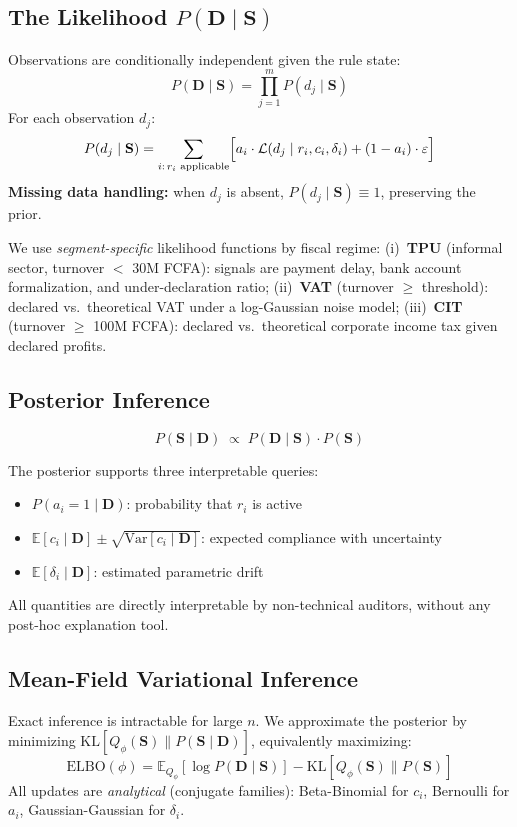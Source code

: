 \documentclass[letterpaper]{article}
\begin{document}
\subsection{The Likelihood $P(\mathbf{D} \mid \mathbf{S})$}

Observations are conditionally independent given the rule state:
\[
  P(\mathbf{D} \mid \mathbf{S}) = \prod_{j=1}^m P(d_j \mid \mathbf{S})
\]
For each observation $d_j$:
\[
  P(d_j \mid \mathbf{S}) = \sum_{i:\, r_i \text{ applicable}}
  \Bigl[a_i \cdot \mathcal{L}(d_j \mid r_i, c_i, \delta_i)
  + (1 - a_i) \cdot \varepsilon\Bigr]
\]
\textbf{Missing data handling:} when $d_j$ is absent,
$P(d_j \mid \mathbf{S}) \equiv 1$, preserving the prior.

We use \emph{segment-specific} likelihood functions by fiscal regime:
(i)~\textbf{TPU} (informal sector, turnover $<$ 30M FCFA): signals
are payment delay, bank account formalization, and under-declaration
ratio; (ii)~\textbf{VAT} (turnover $\geq$ threshold): declared vs.\
theoretical VAT under a log-Gaussian noise model;
(iii)~\textbf{CIT} (turnover $\geq$ 100M FCFA): declared vs.\
theoretical corporate income tax given declared profits.

\subsection{Posterior Inference}

\[
  \boxed{P(\mathbf{S} \mid \mathbf{D}) \;\propto\;
    P(\mathbf{D} \mid \mathbf{S}) \cdot P(\mathbf{S})}
\]

The posterior supports three interpretable queries:
\begin{itemize}[leftmargin=1.5em]
  \item $P(a_i{=}1 \mid \mathbf{D})$: probability that $r_i$ is active
  \item $\mathbb{E}[c_i \mid \mathbf{D}] \pm \sqrt{\mathrm{Var}[c_i \mid \mathbf{D}]}$:
        expected compliance with uncertainty
  \item $\mathbb{E}[\delta_i \mid \mathbf{D}]$: estimated parametric drift
\end{itemize}
All quantities are directly interpretable by non-technical auditors,
without any post-hoc explanation tool.

\subsection{Mean-Field Variational Inference}

Exact inference is intractable for large $n$. We approximate the
posterior by minimizing $\mathrm{KL}[Q_\phi(\mathbf{S}) \|
P(\mathbf{S} \mid \mathbf{D})]$, equivalently maximizing:
\[
  \mathrm{ELBO}(\phi) = \mathbb{E}_{Q_\phi}[\log P(\mathbf{D} \mid \mathbf{S})]
  - \mathrm{KL}[Q_\phi(\mathbf{S}) \| P(\mathbf{S})]
\]
All updates are \emph{analytical} (conjugate families):
Beta-Binomial for $c_i$, Bernoulli for $a_i$,
Gaussian-Gaussian for $\delta_i$.
\end{document}
